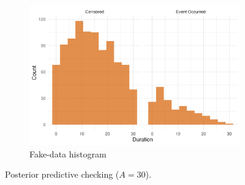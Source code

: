 \begin{figure}[htbp]
\begin{subfigure}[t]{0.37\textwidth}
  \includegraphics[width=\linewidth]{images/fake_duration_hist_a30.png}   %
  \caption{Fake-data histogram}
  \label{fig:fake-hist_a30}
\end{subfigure}
\caption{Posterior predictive checking ($A=30$).}
\label{fig:ppc-A30}
\end{figure}
